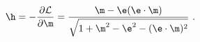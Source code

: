 \begin{equation}
\h =-\frac{\partial {\cal L}}{\partial \m}=\frac{\m -\e (\e\cdot\m)}{\sqrt{1+\m^2-\e^2-(\e\cdot\m)^2}}\ .
\label{s1}
\end{equation}

